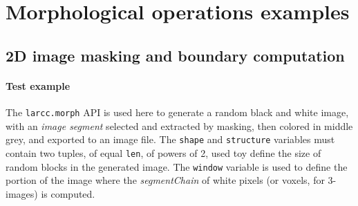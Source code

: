 \documentclass[11pt,oneside]{article}	%
\begin{document}
\section{Morphological operations examples}

\subsection{2D image masking and boundary computation}

\paragraph{Test example}

The \texttt{larcc.morph} API is used here to generate a random black and white image, with an \emph{image segment} selected and extracted by masking, then colored in middle grey, and exported to an image file.  
The \texttt{shape} and \texttt{structure} variables must contain two tuples, of equal \texttt{len}, of powers of 2, used toy define the size of random blocks in the generated image. The \texttt{window} variable is used to define the portion of the image where the \emph{segmentChain} of white pixels (or voxels, for 3-images) is computed.
\end{document}
